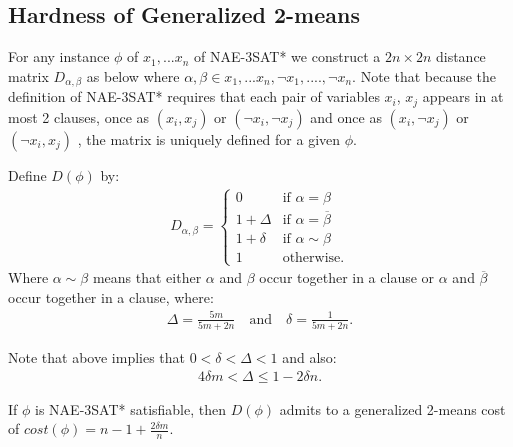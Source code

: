 \subsection{Hardness of Generalized 2-means}

For any instance $\phi$ of $x_1,...x_n$ of NAE-3SAT* we construct a
$2n \times 2n$ distance matrix $D_{\alpha,\beta}$ as below where
$\alpha,\beta \in x_1,...x_n, \neg x_1,....,\neg x_n$.  Note that
because the definition of NAE-3SAT* requires that each pair of
variables $x_i$, $x_j$ appears in at most 2 clauses, once as
$(x_i,x_j)$ or $(\neg x_i, \neg x_j)$ and once as  $(x_i,\neg x_j)$ or
$(\neg x_i, x_j)$ , the matrix is uniquely defined for a given
$\phi$. 
\begin{definition} \label{2-means-distance-matrix} Define
  $D(\phi)$ by:
\begin{align}
  D_{\alpha,\beta} = \begin{cases}
    0 & \textrm{if } \alpha = \beta\\
    1+\Delta  & \mbox{if } \alpha = \overline{\beta} \\
    1+\delta  & \mbox{if } \alpha \sim \beta \\
    1 & \textrm{otherwise}.
  \end{cases}
\end{align}
Where $ \alpha \sim \beta$ means that either $\alpha$ and $\beta$
occur together in a clause or $\alpha$ and $\overline{\beta} $ occur
together in a clause, where:
\begin{align}
  \Delta = \frac{5m}{5m + 2n} \quad\textrm{and}
  \quad\delta = \frac{1}{5m  + 2n}.
\end{align}
\end{definition}
Note that above implies that $0 < \delta < \Delta < 1$ and also:
\begin{align}
4 \delta m < \Delta \le 1 - 2 \delta n.
\end{align}

\begin{lemma} \label{generalized-2-means-cost}
If $\phi$ is NAE-3SAT* satisfiable, then $D(\phi)$ admits to a
generalized 2-means cost of $cost(\phi) = n - 1 + \frac{2\delta
  m}{n}$. 
\end{lemma}

